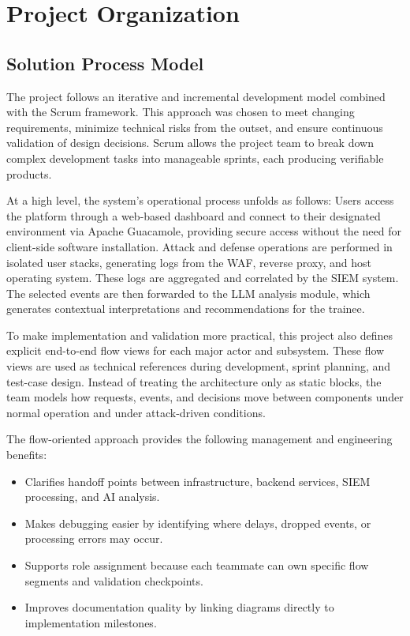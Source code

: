 \section{Project Organization}

\subsection{Solution Process Model}
The project follows an iterative and incremental development model combined with the Scrum framework. This approach was chosen to meet changing requirements, minimize technical risks from the outset, and ensure continuous validation of design decisions. Scrum allows the project team to break down complex development tasks into manageable sprints, each producing verifiable products.

At a high level, the system's operational process unfolds as follows: Users access the platform through a web-based dashboard and connect to their designated environment via Apache Guacamole, providing secure access without the need for client-side software installation. Attack and defense operations are performed in isolated user stacks, generating logs from the WAF, reverse proxy, and host operating system. These logs are aggregated and correlated by the SIEM system. The selected events are then forwarded to the LLM analysis module, which generates contextual interpretations and recommendations for the trainee.

To make implementation and validation more practical, this project also defines explicit end-to-end flow views for each major actor and subsystem. These flow views are used as technical references during development, sprint planning, and test-case design. Instead of treating the architecture only as static blocks, the team models how requests, events, and decisions move between components under normal operation and under attack-driven conditions.

The flow-oriented approach provides the following management and engineering benefits:
\begin{itemize}
\item Clarifies handoff points between infrastructure, backend services, SIEM processing, and AI analysis.
\item Makes debugging easier by identifying where delays, dropped events, or processing errors may occur.
\item Supports role assignment because each teammate can own specific flow segments and validation checkpoints.
\item Improves documentation quality by linking diagrams directly to implementation milestones.
\end{itemize}

